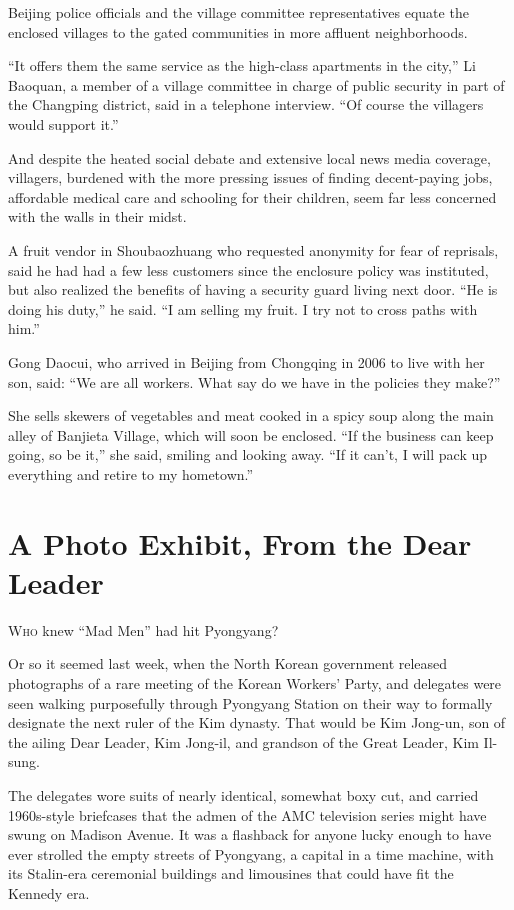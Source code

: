 ﻿\documentclass[12pt]{article}
\begin{document}
Beijing police officials and the village committee representatives equate the enclosed villages to
the gated communities in more affluent neighborhoods.

``It offers them the same service as the high-class apartments in the city,'' Li Baoquan, a member
of a village committee in charge of public security in part of the Changping district, said in a
telephone interview. ``Of course the villagers would support it.''

And despite the heated social debate and extensive local news media coverage, villagers, burdened
with the more pressing issues of finding decent-paying jobs, affordable medical care and schooling
for their children, seem far less concerned with the walls in their midst.

A fruit vendor in Shoubaozhuang who requested anonymity for fear of reprisals, said he had had a few
less customers since the enclosure policy was instituted, but also realized the benefits of having a
security guard living next door. ``He is doing his duty,'' he said. ``I am selling my fruit. I try
not to cross paths with him.''

Gong Daocui, who arrived in Beijing from Chongqing in 2006 to live with her son, said: ``We are all
workers. What say do we have in the policies they make?''

She sells skewers of vegetables and meat cooked in a spicy soup along the main alley of Banjieta
Village, which will soon be enclosed. ``If the business can keep going, so be it,'' she said,
smiling and looking away. ``If it can't, I will pack up everything and retire to my hometown.''

\section{A Photo Exhibit, From the Dear Leader}

\lettrine{W}{ho} knew ``Mad Men'' had hit Pyongyang?

Or so it seemed last week, when the North Korean government released photographs of a rare meeting
of the Korean Workers' Party, and delegates were seen walking purposefully through Pyongyang Station
on their way to formally designate the next ruler of the Kim dynasty. That would be Kim Jong-un, son
of the ailing Dear Leader, Kim Jong-il, and grandson of the Great Leader, Kim Il-sung.

The delegates wore suits of nearly identical, somewhat boxy cut, and carried 1960s-style briefcases
that the admen of the AMC television series might have swung on Madison Avenue. It was a flashback
for anyone lucky enough to have ever strolled the empty streets of Pyongyang, a capital in a time
machine, with its Stalin-era ceremonial buildings and limousines that could have fit the Kennedy
era.
\end{document}
